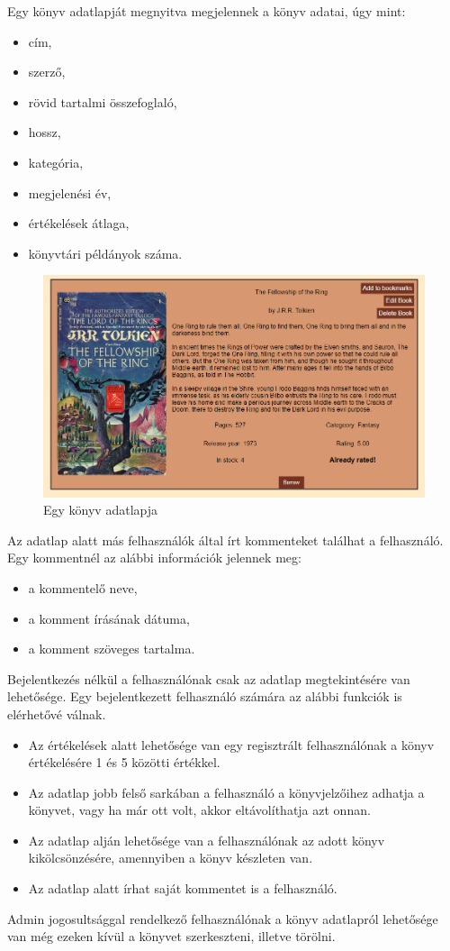 Egy könyv adatlapját megnyitva megjelennek a könyv adatai, úgy mint: 
\begin{itemize}
    \item cím,
    \item szerző,
    \item rövid tartalmi összefoglaló,
    \item hossz,
    \item kategória,
    \item megjelenési év,
    \item értékelések átlaga,
    \item könyvtári példányok száma.
\end{itemize}

\begin{figure}[h]
    \centering
    \includegraphics[scale=0.55]{images/application/bookcard.png}
    \caption{Egy könyv adatlapja}
    \label{fig:bookcard}
\end{figure}

Az adatlap alatt más felhasználók által írt kommenteket találhat a felhasználó. Egy kommentnél az alábbi információk jelennek meg:
\begin{itemize}
    \item a kommentelő neve,
    \item a komment írásának dátuma,
    \item a komment szöveges tartalma.
\end{itemize}
Bejelentkezés nélkül a felhasználónak csak az adatlap megtekintésére van lehetősége. Egy bejelentkezett felhasználó számára az alábbi funkciók is elérhetővé válnak.
\begin{itemize}
    \item Az értékelések alatt lehetősége van egy regisztrált felhasználónak a könyv értékelésére 1 és 5 közötti értékkel.
    \item  Az adatlap jobb felső sarkában a felhasználó a könyvjelzőihez adhatja a könyvet, vagy ha már ott volt, akkor eltávolíthatja azt onnan.
    \item  Az adatlap alján lehetősége van a felhasználónak az adott könyv kikölcsönzésére, amennyiben a könyv készleten van.
    \item  Az adatlap alatt írhat saját kommentet is a felhasználó.
\end{itemize}
Admin jogosultsággal rendelkező felhasználónak a könyv adatlapról lehetősége van még ezeken kívül a könyvet szerkeszteni, illetve törölni.

